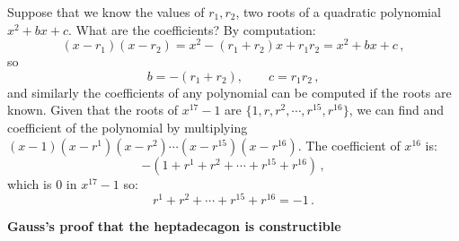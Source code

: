 \documentclass[a4paper,11pt]{article}
\begin{document}
Suppose that we know the values of $r_1,r_2$, two roots of a quadratic polynomial $x^2+bx+c$. What are the coefficients? By computation:
\[
(x-r_1)(x-r_2)=x^2 - (r_1+r_2)x + r_1r_2=x^2+bx+c\,,
\]
so
\begin{equation}\label{eq.v1}
b=-(r_1+r_2), \qquad c=r_1r_2\,,
\end{equation}
and similarly the coefficients of any polynomial can be computed if the roots are known. Given that the roots of $x^{17}-1$ are $\{1,r,r^2,\cdots, r^{15}, r^{16}\}$, we can find and coefficient of the polynomial by multiplying $(x-1)(x-r^1)(x-r^2)\cdots (x-r^{15})(x-r^{16})$. The coefficient of $x^{16}$ is:
\[
-(1+r^1+r^2+\cdots+r^{15}+r^{16})\,,
\]
which is $0$ in $x^{17}-1$ so:
\begin{equation}\label{eq.sum-is-minus1}
r^1+r^2+\cdots+r^{15}+r^{16}=-1\,.
\end{equation}

\textbf{Gauss's proof that the heptadecagon is constructible}
\end{document}
